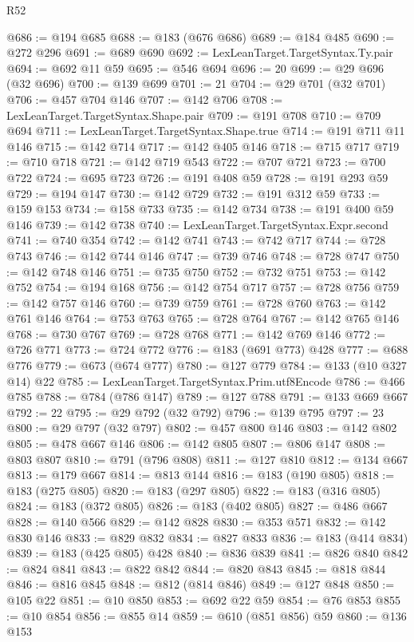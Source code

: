 \begin{lexlean}{R52}
\begin{coremodule}
@686 := @194 @685
@688 := @183 (@676 @686)
@689 := @184 @485
@690 := @272 @296
@691 := @689 @690
@692 := LexLeanTarget.TargetSyntax.Ty.pair
@694 := @692 @11 @59
@695 := @546 @694
@696 := 20
@699 := @29 @696 (@32 @696)
@700 := @139 @699
@701 := 21
@704 := @29 @701 (@32 @701)
@706 := @457 @704 @146
@707 := @142 @706
@708 := LexLeanTarget.TargetSyntax.Shape.pair
@709 := @191 @708
@710 := @709 @694
@711 := LexLeanTarget.TargetSyntax.Shape.true
@714 := @191 @711 @11 @146
@715 := @142 @714
@717 := @142 @405 @146
@718 := @715 @717
@719 := @710 @718
@721 := @142 @719 @543
@722 := @707 @721
@723 := @700 @722
@724 := @695 @723
@726 := @191 @408 @59
@728 := @191 @293 @59
@729 := @194 @147
@730 := @142 @729
@732 := @191 @312 @59
@733 := @159 @153
@734 := @158 @733
@735 := @142 @734
@738 := @191 @400 @59 @146
@739 := @142 @738
@740 := LexLeanTarget.TargetSyntax.Expr.second
@741 := @740 @354
@742 := @142 @741
@743 := @742 @717
@744 := @728 @743
@746 := @142 @744 @146
@747 := @739 @746
@748 := @728 @747
@750 := @142 @748 @146
@751 := @735 @750
@752 := @732 @751
@753 := @142 @752
@754 := @194 @168
@756 := @142 @754 @717
@757 := @728 @756
@759 := @142 @757 @146
@760 := @739 @759
@761 := @728 @760
@763 := @142 @761 @146
@764 := @753 @763
@765 := @728 @764
@767 := @142 @765 @146
@768 := @730 @767
@769 := @728 @768
@771 := @142 @769 @146
@772 := @726 @771
@773 := @724 @772
@776 := @183 (@691 @773) @428
@777 := @688 @776
@779 := @673 (@674 @777)
@780 := @127 @779
@784 := @133 (@10 @327 @14) @22
@785 := LexLeanTarget.TargetSyntax.Prim.utf8Encode
@786 := @466 @785
@788 := @784 (@786 @147)
@789 := @127 @788
@791 := @133 @669 @667
@792 := 22
@795 := @29 @792 (@32 @792)
@796 := @139 @795
@797 := 23
@800 := @29 @797 (@32 @797)
@802 := @457 @800 @146
@803 := @142 @802
@805 := @478 @667 @146
@806 := @142 @805
@807 := @806 @147
@808 := @803 @807
@810 := @791 (@796 @808)
@811 := @127 @810
@812 := @134 @667
@813 := @179 @667
@814 := @813 @144
@816 := @183 (@190 @805)
@818 := @183 (@275 @805)
@820 := @183 (@297 @805)
@822 := @183 (@316 @805)
@824 := @183 (@372 @805)
@826 := @183 (@402 @805)
@827 := @486 @667
@828 := @140 @566
@829 := @142 @828
@830 := @353 @571
@832 := @142 @830 @146
@833 := @829 @832
@834 := @827 @833
@836 := @183 (@414 @834)
@839 := @183 (@425 @805) @428
@840 := @836 @839
@841 := @826 @840
@842 := @824 @841
@843 := @822 @842
@844 := @820 @843
@845 := @818 @844
@846 := @816 @845
@848 := @812 (@814 @846)
@849 := @127 @848
@850 := @105 @22
@851 := @10 @850
@853 := @692 @22 @59
@854 := @76 @853
@855 := @10 @854
@856 := @855 @14
@859 := @610 (@851 @856) @59
@860 := @136 @153

\end{coremodule}
\end{lexlean}
